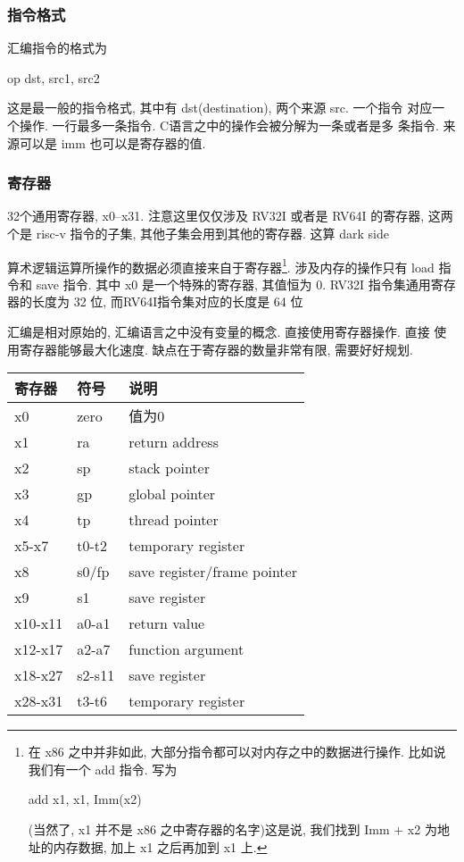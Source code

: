 \documentclass[11pt]{article}
\begin{document}
\subsubsection{指令格式}
\label{sec:org682304c}
汇编指令的格式为 

op dst, src1, src2

这是最一般的指令格式, 其中有 dst(destination), 两个来源 src. 一个指令
对应一个操作. 一行最多一条指令. C语言之中的操作会被分解为一条或者是多
条指令. 来源可以是 imm 也可以是寄存器的值. 

\subsubsection{寄存器}
\label{sec:org6b1a649}

32个通用寄存器, x0--x31. 注意这里仅仅涉及 RV32I 或者是 RV64I 的寄存器,
这两个是 risc-v 指令的子集, 其他子集会用到其他的寄存器. 这算 dark side

算术逻辑运算所操作的数据必须直接来自于寄存器\footnote{在 x86 之中并非如此, 大部分指令都可以对内存之中的数据进行操作.
比如说我们有一个 add 指令. 写为 

add x1, x1, Imm(x2)

(当然了, x1 并不是 x86 之中寄存器的名字)这是说, 我们找到 Imm + x2 为地
址的内存数据, 加上 x1 之后再加到 x1 上.}. 涉及内存的操作只有
load 指令和 save 指令. 其中 x0 是一个特殊的寄存器, 其值恒为 0. RV32I
指令集通用寄存器的长度为 32 位, 而RV64I指令集对应的长度是 64 位

汇编是相对原始的, 汇编语言之中没有变量的概念. 直接使用寄存器操作. 直接
使用寄存器能够最大化速度. 缺点在于寄存器的数量非常有限, 需要好好规划. 


\begin{center}
\begin{tabular}{lll}
\hline
寄存器 & 符号 & 说明\\
\hline
x0 & zero & 值为0\\
x1 & ra & return address\\
x2 & sp & stack pointer\\
x3 & gp & global pointer\\
x4 & tp & thread pointer\\
x5-x7 & t0-t2 & temporary register\\
x8 & s0/fp & save register/frame pointer\\
x9 & s1 & save register\\
x10-x11 & a0-a1 & return value\\
x12-x17 & a2-a7 & function argument\\
x18-x27 & s2-s11 & save register\\
x28-x31 & t3-t6 & temporary register\\
\hline
\end{tabular}
\end{center}
\end{document}
